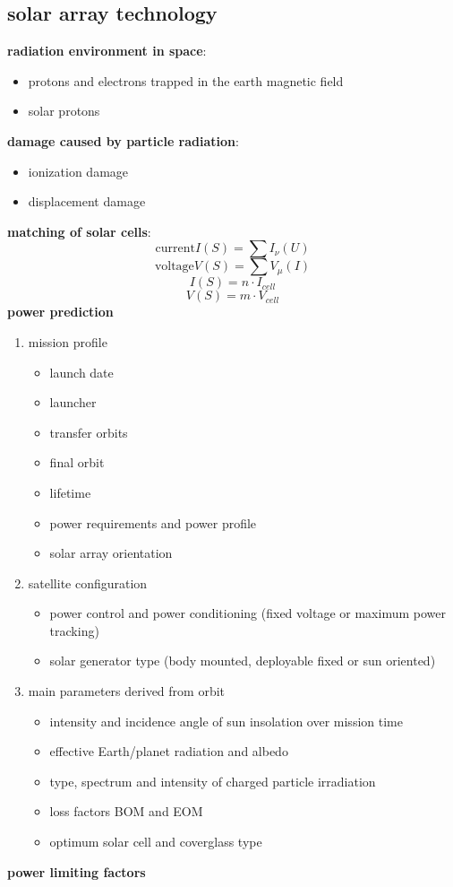 \subsection{solar array technology}
\textbf{radiation environment in space}:
\begin{itemize}
 \item protons and electrons trapped in the earth magnetic field 
 \item solar protons 
\end{itemize}
\textbf{damage caused by particle radiation}:
\begin{itemize}
 \item ionization damage
 \item displacement damage 
\end{itemize}
\textbf{matching of solar cells}:
\[\text{current}I(S) = \sum I_{\nu}(U)\]
\[\text{voltage}V(S) = \sum V_{\mu}(I)\]
\[I(S) = n\cdot I_{cell}\]
\[V(S) = m\cdot V_{cell}\]
\textbf{power prediction}
\begin{enumerate}
 \item mission profile
 \begin{itemize}
  \item launch date
  \item launcher
  \item transfer orbits
  \item final orbit
  \item lifetime
  \item power requirements and power profile
  \item solar array orientation
 \end{itemize}
 \item satellite configuration
 \begin{itemize}
  \item power control and power conditioning (fixed voltage or maximum power tracking)
  \item solar generator type (body mounted, deployable fixed or sun oriented)
 \end{itemize}
 \item main parameters derived from orbit
 \begin{itemize}
  \item intensity and incidence angle of sun insolation over mission time
  \item effective Earth/planet radiation and albedo
  \item type, spectrum and intensity of charged particle irradiation
  \item loss factors BOM and EOM
  \item optimum solar cell and coverglass type
 \end{itemize}
\end{enumerate}
\textbf{power limiting factors} 
\vspace*{3pt}

